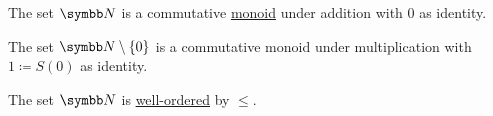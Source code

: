 \begin{proposition}\label{thm:natural_numbers_algebraic_structure}\mbox{}
  \begin{PropEnum}
     The set \( \BN \) is a commutative \hyperref[def:magma]{monoid} under addition with \( 0 \) as identity.

     The set \( \BN \setminus \{ 0 \} \) is a commutative monoid under multiplication with \( 1 \coloneqq S(0) \) as identity.

     The set \( \BN \) is \hyperref[def:well_ordered_set]{well-ordered} by \( \leq \).
  \end{PropEnum}
\end{proposition}
